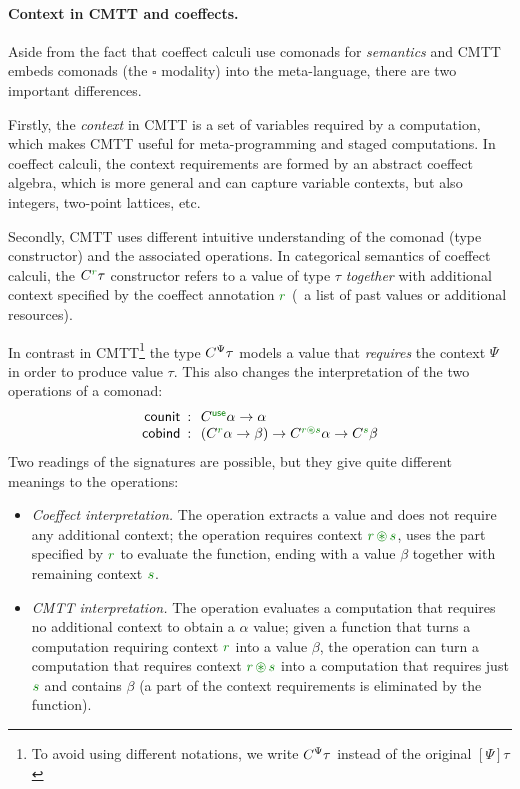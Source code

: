 \paragraph{Context in CMTT and coeffects.}
Aside from the fact that coeffect calculi use comonads for \emph{semantics} and CMTT embeds
comonads (the $\square$ modality) into the meta-language, there are two important differences.

Firstly, the \emph{context} in CMTT is a set of variables required by a computation, which
makes CMTT useful for meta-programming and staged computations. In coeffect calculi, the context
requirements are formed by an abstract coeffect algebra, which is more general and can capture
variable contexts, but also integers, two-point lattices, etc.

Secondly, CMTT uses different intuitive understanding of the comonad (type constructor) and
the associated operations. In categorical semantics of coeffect calculi, the $\ctyp{\cclrd{r}}{\tau}$
constructor refers to a value of type $\tau$ \emph{together} with additional context specified
by the coeffect annotation $\cclrd{r}$ (\eg~a list of past values or additional resources).

In contrast in CMTT\footnote{To avoid using different notations, we write $C^{\Psi}\tau$ instead of the 
original $[\Psi]{\tau}$} the type $C^{\Psi}\tau$ models a value that \emph{requires} the 
context $\Psi$ in order to produce value $\tau$. This also changes the interpretation of the 
two operations of a comonad:
\begin{equation*}
\begin{array}{rcl}
 \ident{counit} &\narrow{:}& \ctyp{\cunit}{\alpha} \rightarrow \alpha\\
 \ident{cobind} &\narrow{:}& (\ctyp{\cclrd{r}}{\alpha} \rightarrow \beta) \rightarrow 
    \ctyp{\cclrd{r}\cseq\cclrd{s}}{\alpha} \rightarrow \ctyp{\cclrd{s}}{\beta}
\end{array}
\end{equation*}
Two readings of the signatures are possible, but they give quite different meanings to the operations:

\begin{itemize}
\item \emph{Coeffect interpretation.} The  operation extracts a value 
  and does not require any additional context; the  operation requires
  context $\cclrd{r}\,\cseq\,\cclrd{s}$, uses the part specified by $\cclrd{r}$ to 
  evaluate the function, ending with a value $\beta$ together with remaining context
  $\cclrd{s}$.
\item \emph{CMTT interpretation.} The  operation evaluates a computation 
  that requires no additional context to obtain a $\alpha$ value; given a function that
  turns a computation requiring context $\cclrd{r}$ into a value $\beta$, the 
  operation can turn a computation that requires context $\cclrd{r}\,\cseq\,\cclrd{s}$ 
  into a computation that requires just $\cclrd{s}$ and contains $\beta$ (a part of the
  context requirements is eliminated by the function).
\end{itemize}

